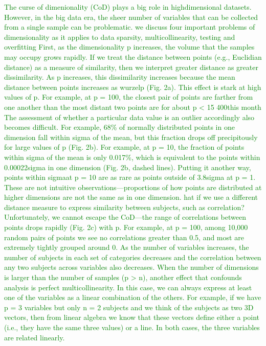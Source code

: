 \textcolor{green}
{ 
The curse of dimenionality (CoD) plays a big role in highdimensional datasets.
However, in the big data era, the sheer number of variables that can be collected from a single sample can be
problematic. we discuss four important problems of dimensionality as it applies to data sparsity, multicollinearity, testing and overfitting
First, as the dimensionality p increases, the volume that the samples may occupy grows rapidly. If we treat the distance between points
(e.g., Euclidian distance) as a measure of similarity, then we interpret greater distance as greater dissimilarity. As p increases, this
dissimilarity increases because the mean distance between points increases as wurzelp (Fig. 2a). This effect is stark at high values of
p. For example, at p = 100, the closest pair of points are farther from one another than the most distant two points are for about p < 15
400this month The assessment of whether a particular data value is an outlier accordingly also becomes difficult. For example, 68\% of normally
distributed points in one dimension fall within sigma of the mean, but this fraction drops off precipitously for large values of p (Fig. 2b).
For example, at p = 10, the fraction of points within sigma of the mean is only 0.017\%, which is equivalent to the points within 0.00022sigma in
one dimension (Fig. 2b, dashed lines). Putting it another way, points within sigmaat p = 10 are as rare as points outside of 3.8sigma at p = 1. 
These are not intuitive observations—proportions of how points are distributed at higher dimensions are not the same as in one dimension.
hat if we use a different distance measure to express similarity between subjects, such as correlation? Unfortunately, we cannot escape the CoD—the range of
correlations between points drops rapidly (Fig. 2c) with p. For example, at p = 100, among 10,000 random pairs of points we see no correlations greater than 0.5, and most
are extremely tightly grouped around 0. As the number of variables increases, the number of subjects in each set of categories decreases and the
correlation between any two subjects across variables also decreases.
When the number of dimensions is larger than the number of samples (p > n), another effect that confounds analysis is perfect multicollinearity.
In this case, we can always express at least one of the variables as a linear combination of the others. For example, if we
have p = 3 variables but only n = 2 subjects and we think of the subjects as two 3D vectors, then from linear algebra we know that
these vectors define either a point (i.e., they have the same three values) or a line. In both cases, the three variables are related linearly.
}

